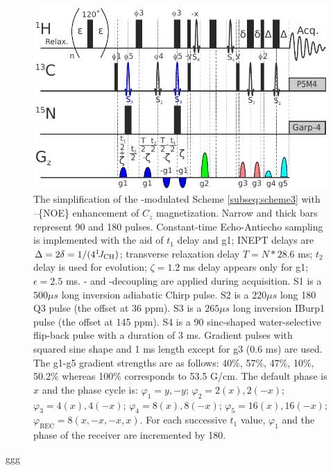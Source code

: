 \documentclass[smallextended]{svjour3}
\begin{document}
\begin{figure}
    \centering
    \includegraphics{FigS2}
    \caption{
        The simplification of the \oneJch-modulated Scheme \ref{subseq:scheme3} with \hlab--\clab \{NOE\} enhancement of $C_z$ magnetization. Narrow and thick bars represent 90\degree{} and 180\degree{} pulses. Constant-time \clab{} Echo-Antiecho sampling is implemented with the aid of $t_1$ delay and g1; INEPT delays are $\Delta = 2\delta = 1/(4 ^1\!J_\text{CH})$; transverse relaxation delay $T = N*28.6$ ms; $t_2$ delay is used for \oneJch{} evolution; $\zeta = 1.2$ ms delay appears only for g1; $\epsilon = 2.5$ ms. \nlab- and \clab-decoupling are applied during acquisition. 
        S1 is a $500 \mu s$ long \clab{} inversion adiabatic Chirp pulse. 
        S2 is a $220 \mu s$ long 180\degree{} Q3 pulse (the offset at 36 ppm). S3 is a $265 \mu s$ long inversion IBurp1 pulse (the offset at 145 ppm).
        S4 is a 90\degree{} sinc-shaped water-selective \hlab{} flip-back pulse with a duration of 3 ms.
        Gradient pulses with squared sine shape and 1 ms length except for g3 (0.6 ms) are used. The g1-g5 gradient strengths are as follows: 40\%, 57\%, 47\%, 10\%, 50.2\% whereas 100\% corresponds to 53.5 G/cm.
        The default phase is $x$ and the phase cycle is: 
        $\varphi_1 = y, -y$; 
        $\varphi_2 = 2(x), 2(-x)$; 
        $\varphi_3 = 4(x), 4(-x)$; 
        $\varphi_4 = 8(x), 8(-x)$; 
        $\varphi_5 = 16(x), 16(-x)$; 
        $\varphi_\text{REC} = 8(x, -x, -x, x)$. 
        For each successive $t_1$ value, $\varphi_1$ and the phase of the receiver are incremented by 180\degree. 
    }
    \label{fig:scheme5}
\end{figure}
ggg
\end{document}
